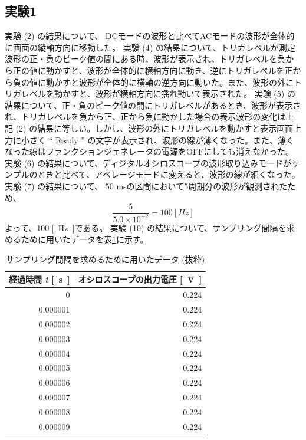 \subsection{実験1}
実験 (2) の結果について、 DCモードの波形と比べてACモードの波形が全体的に画面の縦軸方向に移動した。
実験 (4) の結果について、トリガレベルが測定波形の正・負のピーク値の間にある時、波形が表示され、トリガレベルを負から正の値に動かすと、波形が全体的に横軸方向に動き、逆にトリガレベルを正から負の値に動かすと波形が全体的に横軸の逆方向に動いた。また、波形の外にトリガレベルを動かすと、波形が横軸方向に揺れ動いて表示された。
実験 (5) の結果について、正・負のピーク値の間にトリガレベルがあるとき、波形が表示され、トリガレベルを負から正、正から負に動かした場合の表示波形の変化は上記 (2) の結果に等しい。しかし、波形の外にトリガレベルを動かすと表示画面上方に小さく “ Ready ” の文字が表示され、波形の線が薄くなった。また、薄くなった線はファンクションジェネレータの電源をOFFにしても消えなかった。
実験 (6) の結果について、ディジタルオシロスコープの波形取り込みモードがサンプルのときと比べて、アベレージモードに変えると、波形の線が細くなった。
実験 (7) の結果について、 50 msの区間において5周期分の波形が観測されたため、\\
  \begin{equation*}
    \frac{5}{5.0\times10^{-2}} = 100 \si{[Hz]}
  \end{equation*}
よって、100 \si{[Hz]}である。
実験 (10) の結果について、サンプリング間隔を求めるために用いたデータを表\ref{tb2}に示す。
  \begin{table}[ht]
    \centering
    \caption{サンプリング間隔を求めるために用いたデータ (抜粋)}
    \begin{tabular}[t]{rr}
    \toprule
    \multicolumn{1}{c}{経過時間 \textit{t} \si{[s]}}&\multicolumn{1}{c}{オシロスコープの出力電圧 \si{[V]}}\\
    \midrule
    0&0.224\\
    0.000001&0.224\\
    0.000002&0.224\\
    0.000003&0.224\\
    0.000004&0.224\\
    0.000005&0.224\\
    0.000006&0.224\\
    0.000007&0.224\\
    0.000008&0.224\\
    0.000009&0.224\\
    \bottomrule
    \end{tabular}
    \label{tb2}
  \end{table}

